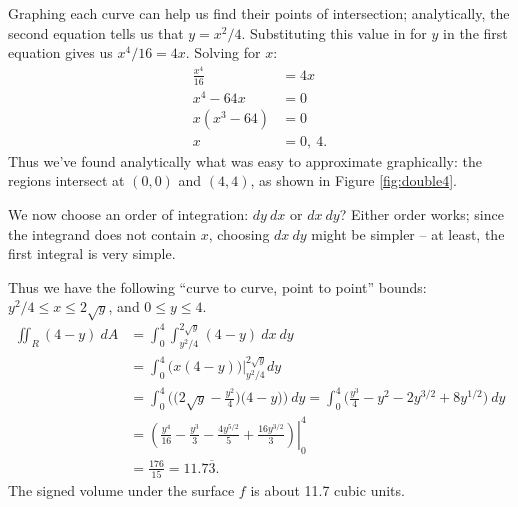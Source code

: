 {Graphing each curve can help us find their points of intersection; analytically, the second equation tells us that $y=x^2/4$. Substituting this value in for $y$ in the first equation gives us $x^4/16 = 4x$. Solving for $x$:
\begin{align*}
\frac{x^4}{16} &= 4x\\
x^4-64x &=0\\
x(x^3-64) &=0\\
x&= 0,\ 4.
\end{align*}
Thus we've found analytically what was easy to approximate graphically: the regions intersect at $(0,0)$ and $(4,4)$, as shown in Figure \ref{fig:double4}. 

We now choose an order of integration: $dy\ dx$ or $dx\ dy$? Either order works; since the integrand does not contain $x$, choosing $dx\ dy$ might be simpler -- at least, the first integral is very simple.

Thus we have the following ``curve to curve, point to point'' bounds: $y^2/4\leq x\leq 2\sqrt y$, and $0\leq y\leq 4$. 
\begin{align*}
\iint_R (4-y)\ dA &= \int_0^4\int_{y^2/4}^{2\sqrt{y}}(4-y)\ dx\ dy\\
				&= \int_0^4 \big(x(4-y)\big)\Big|_{y^2/4}^{2\sqrt{y}} dy\\
				&= \int_0^4 \Big(\big(2\sqrt{y}-\frac{y^2}{4}\big)\big(4-y)\Big)\ dy = \int_0^4 \Big( \frac{y^3}{4}-y^2-2y^{3/2}+8y^{1/2}\Big)\ dy\\
				&= \left.\left(\frac{y^4}{16}-\frac{y^3}{3}-\frac{4y^{5/2}}5+\frac{16y^{3/2}}3\right)\right|_0^4\\
				&= \frac{176}{15} = 11.7\overline{3}.
\end{align*}
The signed volume under the surface $f$ is about 11.7 cubic units.
}\\

